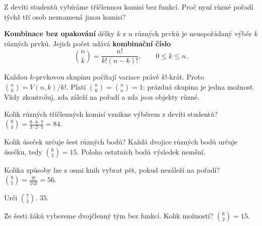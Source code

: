 \documentclass[11pt,a4paper]{article}
\begin{document}

Z devíti studentů vybíráme tříčlennou komisi bez funkcí. Proč nyní různé pořadí týchž tří osob neznamená jinou komisi?



\begin{definiceBox}
\textbf{Kombinace bez opakování} délky $k$ z $n$ různých prvků je neuspořádaný výběr $k$ různých prvků. Jejich počet udává \textbf{kombinační číslo}
\[
\binom nk=\frac{n!}{k!(n-k)!},\qquad 0\le k\le n.
\]
\end{definiceBox}
Každou $k$-prvkovou skupinu počítají variace právě $k!$-krát. Proto $\binom nk=V(n,k)/k!$. Platí $\binom n0=\binom nn=1$; prázdná skupina je jedna možnost. Vždy zkontroluj, zda záleží na pořadí a zda jsou objekty různé.


\begin{prikladReseniBox}[title={Příklad 1}]
Kolik různých tříčlenných komisí vznikne výběrem z devíti studentů?
\tcblower
$\binom93=\frac{9\cdot8\cdot7}{3\cdot2\cdot1}=84$.
\end{prikladReseniBox}



\begin{prikladReseniBox}[title={Příklad 2}]
Kolik úseček určuje šest různých bodů?
\tcblower
Každá dvojice různých bodů určuje úsečku, tedy $\binom62=15$. Poloha ostatních bodů výsledek nemění.
\end{prikladReseniBox}



\begin{prikladReseniBox}[title={Příklad 3}]
Kolika způsoby lze z osmi knih vybrat pět, pokud nezáleží na pořadí?
\tcblower
$\binom85=\frac{8!}{5!3!}=56$.
\end{prikladReseniBox}




\begin{zadaniReseniBox}[title={Samostatná práce 1}]
Urči $\binom73$.
\tcblower
$35$.
\end{zadaniReseniBox}



\begin{zadaniReseniBox}[title={Samostatná práce 2}]
Ze šesti žáků vybereme dvojčlenný tým bez funkcí. Kolik možností?
\tcblower
$\binom62=15$.
\end{zadaniReseniBox}
\end{document}
